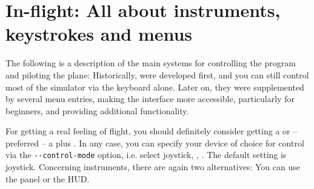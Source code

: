 \emph{}%

\chapter{In-flight: All about instruments, keystrokes and menus\label{flight}}

The following is a description of the main systems for controlling the
program and piloting the plane: Historically,  were developed
first, and you can still control most of the simulator via the keyboard alone. Later on,
they were supplemented by several menu entries, making the interface more accessible,
particularly for beginners, and providing additional functionality. 

For getting a real feeling of flight, you should definitely consider getting a  or -- preferred -- a  plus . In any case, you
can specify your device of choice for control via the \texttt{-$ $-control-mode} option,
i.e. select joystick, , . The default setting is joystick.
Concerning instruments, there are again two alternatives: You can use the panel or the
HUD.

